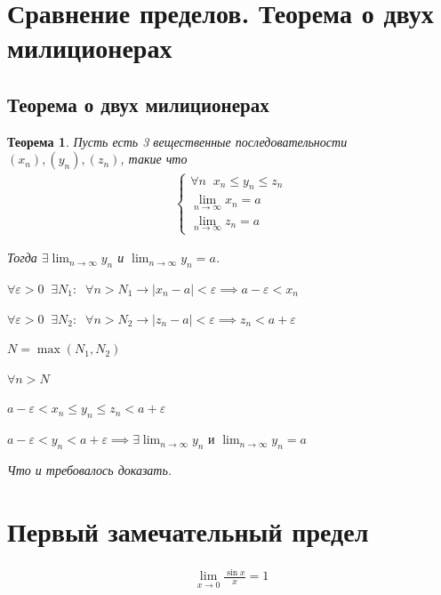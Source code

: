 \documentclass[a4paper,12pt,oneside]{extbook}
\newcommand{\newpar}{$ $\par\nobreak\ignorespaces}
\theoremstyle{numbered}
\theoremstyle{unnumbered}
\theoremstyle{named}
\newtheorem{theorem}{Теорема}[section]
\theoremstyle{unnumbered}
\theoremstyle{named}
\theoremstyle{named}
\theoremstyle{named}
\renewenvironment{proof}[1][]{\breakenv[Доказательство]{\if\relax\detokenize{#1}\relax\else\;\fi}{\textbf{#1}}}{\smallskip\newpar \hfill\textit{Что и требовалось доказать.}}
\begin{document}
\section{Сравнение пределов. Теорема о двух милиционерах}%
\label{sec:Сравнение пределов. Теорема о двух милиционерах}

\subsection{Теорема о двух милиционерах}%
\label{sub:Теорема о двух милиционерах}
\begin{theorem}
    Пусть есть 3 вещественные последовательности \((x_n), (y_n), (z_n)\), такие что
    \begin{gather*}
        \begin{cases}
            \forall n \;\; x_n \leq y_n \leq z_n        \\
            \displaystyle{\lim_{n \to \infty}{x_n}} = a \\
            \displaystyle{\lim_{n \to \infty}{z_n}} = a
        \end{cases}
    \end{gather*}

    Тогда \(\exists \displaystyle{\lim_{n \to \infty}{y_n}}\) и  \(\displaystyle{\lim_{n \to \infty}{y_n}} = a\).
\end{theorem}

\begin{proof}
    \(
    \forall \varepsilon > 0 \;\; \exists N_1: \;\; \forall n > N_1 \rightarrow |x_n - a| < \varepsilon \implies a - \varepsilon < x_n
    \)

    \(
    \forall \varepsilon > 0 \;\; \exists N_2: \;\; \forall n > N_2 \rightarrow |z_n - a| < \varepsilon \implies z_n < a + \varepsilon
    \)

    \(N = \max(N_1, N_2)\)

    \medskip

    \(\forall n > N\)

    \(a - \varepsilon < x_n \leq y_n \leq z_n < a + \varepsilon\)

    \(a - \varepsilon < y_n < a + \varepsilon \implies \exists \displaystyle{\lim_{n \to \infty}{y_n}} \text{ и } \displaystyle{\lim_{n \to \infty}{y_n}} = a\)
\end{proof}

\section{Первый замечательный предел}\label{sec:limit_1}
\begin{gather*}
    \lim_{x \to 0}{\frac{\sin{x}}{x}} = 1
\end{gather*}
\end{document}

